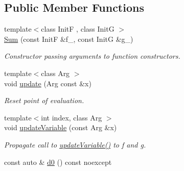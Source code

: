 \subsection*{Public Member Functions}
\begin{DoxyCompactItemize}
\item 
{\footnotesize template$<$class Init\-F , class Init\-G $>$ }\\\hyperlink{structFunG_1_1MathematicalOperations_1_1Sum_ac19577debb0ed58ab8dc809e46d5d18c}{Sum} (const Init\-F \&f\-\_\-, const Init\-G \&g\-\_\-)
\begin{DoxyCompactList}\small\item\em Constructor passing arguments to function constructors. \end{DoxyCompactList}\item 
\hypertarget{structFunG_1_1MathematicalOperations_1_1Sum_abd35f8e65137de573ec0d0176c986d15}{{\footnotesize template$<$class Arg $>$ }\\void \hyperlink{structFunG_1_1MathematicalOperations_1_1Sum_abd35f8e65137de573ec0d0176c986d15}{update} (Arg const \&x)}\label{structFunG_1_1MathematicalOperations_1_1Sum_abd35f8e65137de573ec0d0176c986d15}

\begin{DoxyCompactList}\small\item\em Reset point of evaluation. \end{DoxyCompactList}\item 
\hypertarget{structFunG_1_1MathematicalOperations_1_1Sum_a8a4d8c1a08a72b21cfdc9d607ced04d4}{{\footnotesize template$<$int index, class Arg $>$ }\\void \hyperlink{structFunG_1_1MathematicalOperations_1_1Sum_a8a4d8c1a08a72b21cfdc9d607ced04d4}{update\-Variable} (const Arg \&x)}\label{structFunG_1_1MathematicalOperations_1_1Sum_a8a4d8c1a08a72b21cfdc9d607ced04d4}

\begin{DoxyCompactList}\small\item\em Propagate call to \hyperlink{structFunG_1_1MathematicalOperations_1_1Sum_a8a4d8c1a08a72b21cfdc9d607ced04d4}{update\-Variable()} to f and g. \end{DoxyCompactList}\item 
\hypertarget{structFunG_1_1MathematicalOperations_1_1Sum_ab91123e8ebd8175db9fda72c11cd1940}{const auto \& \hyperlink{structFunG_1_1MathematicalOperations_1_1Sum_ab91123e8ebd8175db9fda72c11cd1940}{d0} () const noexcept}\label{structFunG_1_1MathematicalOperations_1_1Sum_ab91123e8ebd8175db9fda72c11cd1940}


\end{DoxyCompactItemize}
